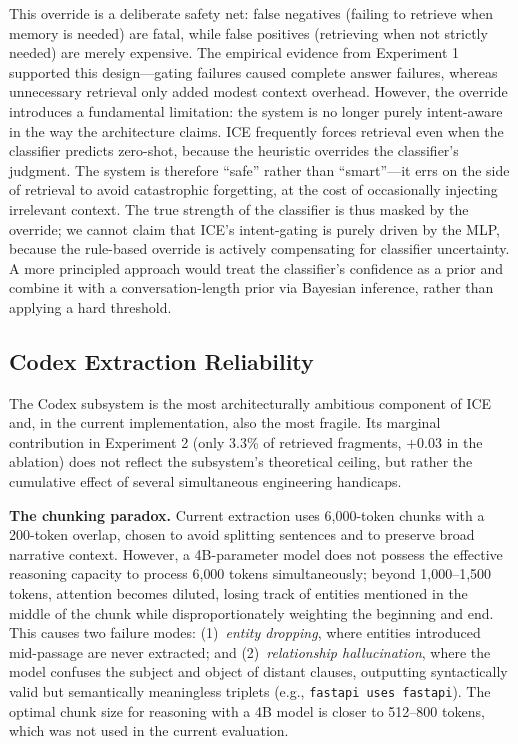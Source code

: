 \documentclass[11pt,a4paper]{article}
\begin{document}
This override is a deliberate safety net: false negatives (failing to retrieve when memory is needed) are fatal, while false positives (retrieving when not strictly needed) are merely expensive. The empirical evidence from Experiment 1 supported this design---gating failures caused complete answer failures, whereas unnecessary retrieval only added modest context overhead. However, the override introduces a fundamental limitation: the system is no longer purely intent-aware in the way the architecture claims. ICE frequently forces retrieval even when the classifier predicts zero-shot, because the heuristic overrides the classifier's judgment. The system is therefore ``safe'' rather than ``smart''---it errs on the side of retrieval to avoid catastrophic forgetting, at the cost of occasionally injecting irrelevant context. The true strength of the classifier is thus masked by the override; we cannot claim that ICE's intent-gating is purely driven by the MLP, because the rule-based override is actively compensating for classifier uncertainty. A more principled approach would treat the classifier's confidence as a prior and combine it with a conversation-length prior via Bayesian inference, rather than applying a hard threshold.

\subsection{Codex Extraction Reliability}
The Codex subsystem is the most architecturally ambitious component of ICE and, in the current implementation, also the most fragile. Its marginal contribution in Experiment 2 (only 3.3\% of retrieved fragments, $+0.03$ in the ablation) does not reflect the subsystem's theoretical ceiling, but rather the cumulative effect of several simultaneous engineering handicaps.

\textbf{The chunking paradox.} Current extraction uses 6{,}000-token chunks with a 200-token overlap, chosen to avoid splitting sentences and to preserve broad narrative context. However, a 4B-parameter model does not possess the effective reasoning capacity to process 6{,}000 tokens simultaneously; beyond 1{,}000--1{,}500 tokens, attention becomes diluted, losing track of entities mentioned in the middle of the chunk while disproportionately weighting the beginning and end. This causes two failure modes: (1)~\emph{entity dropping}, where entities introduced mid-passage are never extracted; and (2)~\emph{relationship hallucination}, where the model confuses the subject and object of distant clauses, outputting syntactically valid but semantically meaningless triplets (e.g., \texttt{fastapi uses fastapi}). The optimal chunk size for reasoning with a 4B model is closer to 512--800 tokens, which was not used in the current evaluation.
\end{document}

